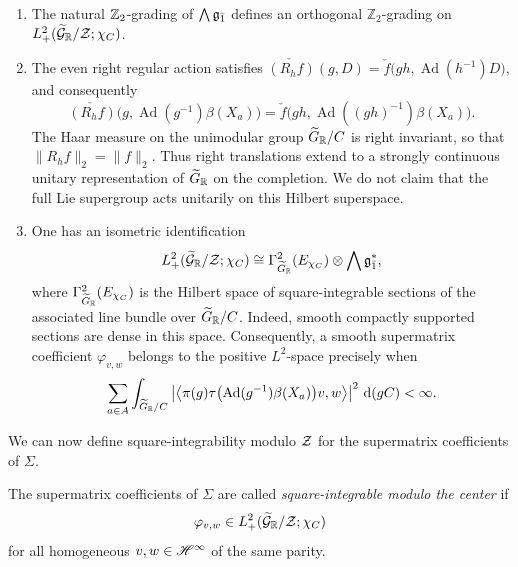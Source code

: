 \begin{remark}\label{rmk::right_translations_are_unitary}
\leavevmode
\begin{enumerate}
\item[(a)] 
The natural ${\mathbb Z}_{2}$-grading of $\bigwedge{\mathfrak{g}_{\bar{1}}}$ defines an orthogonal $\mathbb Z_2$-grading on $L^2_+(\widetilde{{\mathcal{G}}}_{{\mathbb R}}/{\mathcal{Z}};\chi_C)$.
 
\item[(b)]
The even right regular action satisfies
$
\check{(R_hf)}(g,D)
=
\check f\bigl(gh,\operatorname{Ad}(h^{-1})D\bigr),
$
and consequently
\[
\check{(R_hf)}
\bigl(g,\operatorname{Ad}(g^{-1})\beta(X_{a})\bigr)
=
\check f\bigl(gh,\operatorname{Ad}((gh)^{-1})\beta(X_{a})\bigr).
\]
The Haar measure on the unimodular group
$\widetilde{G}_{{\mathbb R}}/C$ is right invariant, so that $\|R_hf\|_2=\|f\|_2$.
Thus right translations extend to a strongly continuous unitary
representation of $\widetilde{G}_{{\mathbb R}}$ on the completion.
We do not claim that the full Lie supergroup acts unitarily
on this Hilbert superspace.
\item[(c)] One has an isometric identification
\begin{equation*}
L^2_+(\widetilde{{\mathcal{G}}}_{{\mathbb R}}/{\mathcal{Z}};\chi_C)
\cong
\Gamma^2_{\widetilde{G}_{{\mathbb R}}}(E_{\chi_C})
\otimes\bigwedge{\mathfrak{g}}_{\bar1}^{\ast},
\end{equation*}
where $\Gamma^2_{\widetilde{G}_{{\mathbb R}}}(E_{\chi_C})$ is the Hilbert space of square-integrable sections of the associated line bundle over $\widetilde{G}_{{\mathbb R}}/C$. Indeed, smooth compactly supported sections are dense in this space. Consequently, a smooth supermatrix coefficient $\varphi_{v,w}$ belongs to the positive $L^2$-space precisely when
\begin{equation*}
\sum_{a\in A}
\int_{\widetilde{G}_{{\mathbb R}}/C}
\left|
\left\langle
\pi(g)\tau\bigl(\operatorname{Ad}(g^{-1})\beta(X_{a})\bigr)v,w
\right\rangle
\right|^2\,\mathrm{d}(gC)
<\infty.
\end{equation*}

\end{enumerate}
\end{remark}

We can now define square-integrability modulo ${\mathcal{Z}}$ for the supermatrix coefficients of $\Sigma$.

\begin{definition}
The supermatrix coefficients of $\Sigma$ are called
\emph{square-integrable modulo the center} if
\begin{equation*}
\varphi_{v,w}\in
L^2_+(\widetilde{{\mathcal{G}}}_{{\mathbb R}}/{\mathcal{Z}};\chi_C)
\end{equation*}
for all homogeneous $v,w\in{\mathscr{H}}^\infty$ of the same parity.
\end{definition}


